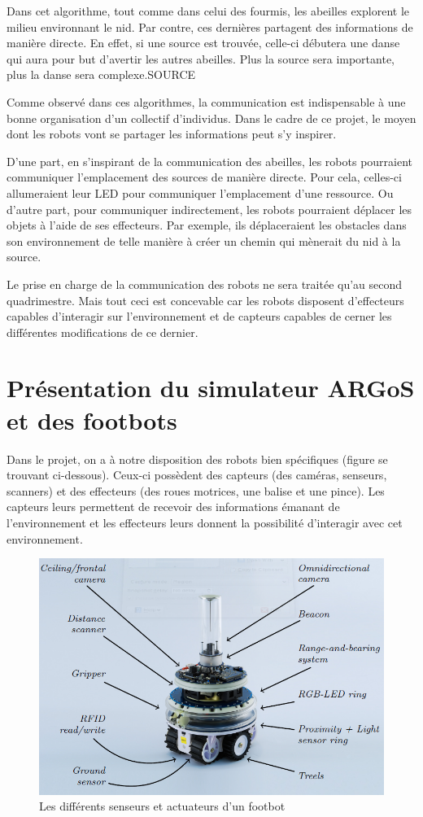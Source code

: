 \documentclass[a4paper,12pt]{report}
\begin{document}
Dans cet algorithme, tout comme dans celui des fourmis, les abeilles explorent le milieu environnant le nid. Par contre, ces dernières partagent des informations de manière directe. En effet, si une source est trouvée, celle-ci débutera une danse qui aura pour but d'avertir les autres abeilles. Plus la source sera importante, plus la danse sera complexe.SOURCE

Comme observé dans ces algorithmes, la communication est indispensable à une bonne organisation d'un collectif d'individus. Dans le cadre de ce projet, le moyen dont les robots vont se partager les informations peut s'y inspirer.

D'une part, en s'inspirant de la communication des abeilles, les robots pourraient communiquer l'emplacement des sources de manière directe. Pour cela, celles-ci allumeraient leur LED pour communiquer l'emplacement d'une ressource. Ou d'autre part, pour communiquer indirectement, les robots pourraient déplacer les objets à l'aide de ses effecteurs. Par exemple, ils déplaceraient les obstacles dans son environnement de telle manière à créer un chemin qui mènerait du nid à la source.

Le prise en charge de la communication des robots ne sera traitée qu'au second quadrimestre. Mais tout ceci est concevable car les robots disposent d'effecteurs capables d'interagir sur l'environnement et de capteurs capables de cerner les différentes modifications de ce dernier.

\chapter[ARGoS et les footbots]{Présentation du simulateur ARGoS et des footbots\label{chap:argosFootbot}}

Dans le projet, on a à notre disposition des robots bien spécifiques (figure se trouvant ci-dessous). Ceux-ci possèdent des capteurs (des caméras, senseurs, scanners) et des effecteurs (des roues motrices, une balise et une pince). Les capteurs leurs permettent de recevoir des informations émanant de l'environnement et les effecteurs leurs donnent la possibilité d’interagir avec cet environnement.
\begin{figure}[h!]
   \includegraphics[width=\textwidth]{footbot.png}
      \caption{Les différents senseurs et actuateurs d'un footbot \cite{argosSite1}}
\end{figure}
\end{document}
